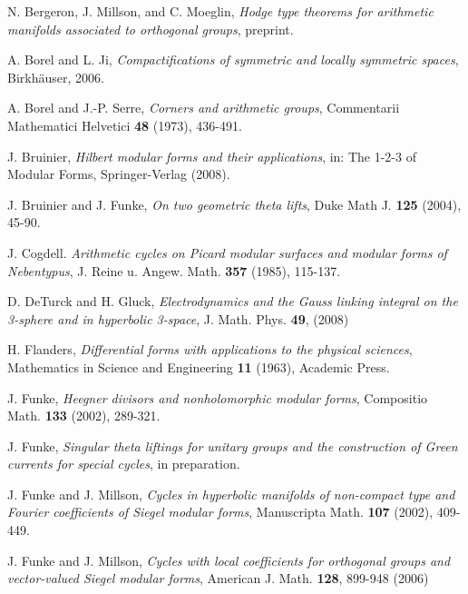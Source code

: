 \documentclass[12pt,leqno]{amsart}
\numberwithin{equation}{section}
\theoremstyle{plain}
\theoremstyle{definition}
\theoremstyle{remark}
\begin{document}
\begin{thebibliography}{99}




N. Bergeron, J. Millson, and C. Moeglin, \emph{Hodge type theorems for arithmetic manifolds associated to orthogonal groups}, preprint.



A. Borel and L. Ji, \emph{Compactifications of symmetric and locally
symmetric spaces}, Birkh\"auser, 2006.



 A. Borel and J.-P. Serre, {\em Corners and arithmetic groups}, Commentarii Mathematici Helvetici \textbf{48} (1973), 436-491.





J. Bruinier, \emph{Hilbert modular forms and their applications}, in: The 1-2-3 of Modular Forms, Springer-Verlag (2008). 




J. Bruinier and J. Funke, \emph{On two geometric theta lifts}, Duke
Math J. \textbf{125} (2004), 45-90.


J. Cogdell.
\emph{Arithmetic cycles on Picard modular surfaces and modular forms of Nebentypus}, J. Reine u. Angew. Math. \textbf{357} (1985), 115-137.

D. DeTurck and H. Gluck, \emph{Electrodynamics and the Gauss linking integral on the 3-sphere and in hyperbolic 3-space}, J. Math. Phys. \textbf{49}, (2008) 

H. Flanders, \emph{Differential forms with applications to the physical sciences},
Mathematics in Science and Engineering \textbf{11} (1963), Academic Press.


J. Funke, \emph{Heegner divisors and nonholomorphic modular forms},
Compositio Math. \textbf{133} (2002), 289-321.

J. Funke, \emph{Singular theta liftings for unitary groups and the construction of Green currents for special cycles}, in preparation.



J. Funke and J. Millson, \emph{Cycles in hyperbolic manifolds of
non-compact type and Fourier coefficients of Siegel modular forms},
Manuscripta Math. \textbf{107} (2002), 409-449.


J. Funke and J. Millson, \emph{Cycles with local coefficients for
orthogonal groups and vector-valued Siegel modular forms}, American J. Math. \textbf{128}, 899-948 (2006)


\end{thebibliography}
\end{document}

